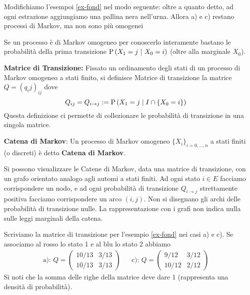 \begin{exmp}
	Modifichiamo l'esempoi  \ref{ex-fond} nel modo seguente: oltre a quanto detto, ad ogni estrazione 
	aggiungiamo una pallina nera nell'urna. Allora a) e c) restano processi di Markov, ma non sono 
	pi\`u omogenei
\end{exmp}

\begin{note} Se un processo \`e di Markov omogeneo per conoscerlo interamente bastano le probabilit\`a della prima transizione $\text{P}\left(X_{1}=j\ |\ X_{0}=i\right)$ (oltre alla marginale $X_0$).
\end{note}

\begin{defn}
	\textbf{Matrice di Transizione:}
		Fissato un ordinamento degli stati di un processo di Markov omogeneo a stati finito, si definisce
		Matrice di transizione la matrice $Q=(q_ij)_{ij}$ dove
		\begin{equation*}
		 Q_{ij} = Q_{i \to j} := \text{P}\left(X_1 = j \mid I \cap \{X_0 = i\}\right)
		\end{equation*}
Questa definizione ci permette di collezionare le probabilit\`a di transizione in una singola matrice.
\end{defn}

\begin{defn}
	\textbf{Catena di Markov}:
	Un processo di Markov omogeneo $ \{X_i\}_{i=0,\hdots,n} $ a stati finiti (o discreti) \`e  detto \textbf{Catena di Markov}.
\end{defn}
	Si possono visualizzare le Catene di Markov, data una matrice di transizione, con un grafo orientato analogo agli automi a stati finiti.
	Ad ogni stato $ i \in E $ facciamo corrispondere un nodo, e ad ogni probabilit\`a di transizione 
	$ Q_{i \to j} $ strettamente positiva facciamo corrispondere un arco $ (i, j) $. Non si disegnano gli archi delle probabilit\`a di transizione nulle. La rappresentazione con i grafi non indica nulla sulle leggi marginali della catena.

\begin{exmp}
Scriviamo la matrice di transizione per l'esempio \ref{ex-fond} nei casi a) e c).
Se associamo al rosso lo stato 1 e al blu lo stato 2
abbiamo
\begin{eqnarray*}
	\text{a): }Q = \begin{pmatrix}
	10/13 & 3/13 \\
	10/13 & 3/13
	\end{pmatrix}
		&&
	\text{c): }Q = \begin{pmatrix}
	9/12 & 3/12 \\
	10/12 & 2/12
	\end{pmatrix}
\end{eqnarray*}
Si noti che la somma delle righe della matrice deve dare 1 (rappresenta una densit\`a di probabilit\`a).
\end{exmp}

